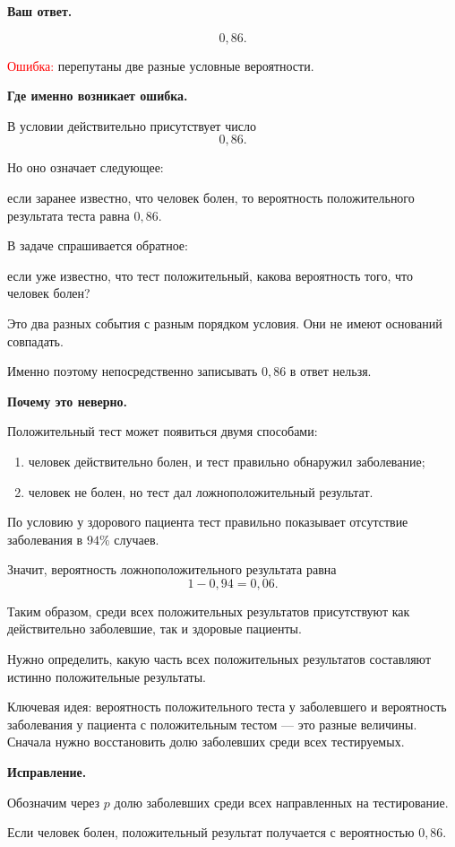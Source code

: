 \documentclass[12pt,a4paper]{article}
\newcommand{\errorlabel}[1]{\textcolor{red}{Ошибка:} #1}
\newcommand{\keyidea}[1]{\textcolor{blue!60!black}{Ключевая идея:} #1}
\begin{document}
\textbf{Ваш ответ.}

\[
0{,}86.
\]

\errorlabel{ перепутаны две разные условные вероятности.}

\textbf{Где именно возникает ошибка.}

В условии действительно присутствует число
\[
0{,}86.
\]

Но оно означает следующее:

если заранее известно, что человек болен, то вероятность положительного
результата теста равна $0{,}86$.

В задаче спрашивается обратное:

если уже известно, что тест положительный, какова вероятность того,
что человек болен?

Это два разных события с разным порядком условия. Они не имеют оснований
совпадать.

Именно поэтому непосредственно записывать $0{,}86$ в ответ нельзя.

\textbf{Почему это неверно.}

Положительный тест может появиться двумя способами:

\begin{enumerate}
    \item человек действительно болен, и тест правильно обнаружил заболевание;
    \item человек не болен, но тест дал ложноположительный результат.
\end{enumerate}

По условию у здорового пациента тест правильно показывает отсутствие
заболевания в $94\%$ случаев.

Значит, вероятность ложноположительного результата равна
\[
1-0{,}94=0{,}06.
\]

Таким образом, среди всех положительных результатов присутствуют как
действительно заболевшие, так и здоровые пациенты.

Нужно определить, какую часть всех положительных результатов составляют
истинно положительные результаты.

\keyidea{ вероятность положительного теста у заболевшего и вероятность заболевания у пациента с положительным тестом --- это разные величины. Сначала нужно восстановить долю заболевших среди всех тестируемых.}

\textbf{Исправление.}

Обозначим через $p$ долю заболевших среди всех направленных на тестирование.

Если человек болен, положительный результат получается с вероятностью
$0{,}86$.
\end{document}
